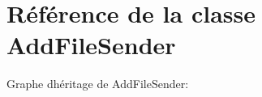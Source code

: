 \hypertarget{classAddFileSender}{}\section{Référence de la classe Add\+File\+Sender}
\label{classAddFileSender}


Graphe d\textquotesingle{}héritage de Add\+File\+Sender\+:

